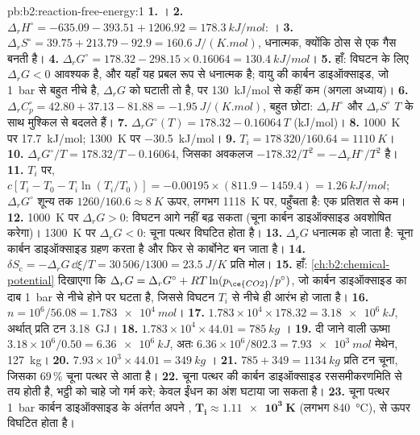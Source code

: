 \begin{solution}{pb:b2:reaction-free-energy:1}
\textbf{1.} ।
\textbf{2.} $\Delta_r H^\circ = -635.09 - 393.51 + 1206.92 =
\qty{+178.3}{kJ/mol}$: ।
\textbf{3.} $\Delta_r S^\circ = 39.75 + 213.79 - 92.9 = \qty{+160.6}{J/(K.mol)}$,
धनात्मक, क्योंकि ठोस से एक गैस बनती है।
\textbf{4.} $\Delta_r G^\circ = 178.32 - 298.15 \times 0.16064 =
\qty{+130.4}{kJ/mol}$।
\textbf{5.} हाँ: विघटन के लिए $\Delta_r G < 0$ आवश्यक है, और यहाँ यह
प्रबल रूप से धनात्मक है; वायु की कार्बन डाइऑक्साइड, जो \qty{1}{bar} से बहुत नीचे है,
$\Delta_r G$ को घटाती तो है, पर \qty{130}{kJ/mol} से कहीं कम (अगला अध्याय)।
\textbf{6.} $\Delta_r C^\circ_p = 42.80 + 37.13 - 81.88 =
\qty{-1.95}{J/(K.mol)}$, बहुत छोटा: $\Delta_r H^\circ$ और $\Delta_r S^\circ$
$T$ के साथ मुश्किल से बदलते हैं।
\textbf{7.} $\Delta_r G^\circ(T) = 178.32 - 0.16064\,T$ (\unit{kJ/mol})।
\textbf{8.} \qty{1000}{K} पर \qty{+17.7}{kJ/mol}; \qty{1300}{K} पर
\qty{-30.5}{kJ/mol}।
\textbf{9.} $T_i = 178\,320/160.64 = \qty{1110}{K}$।
\textbf{10.} $\Delta_r G^\circ/T = 178.32/T - 0.16064$, जिसका अवकलज
$-178.32/T^2 = -\Delta_r H^\circ/T^2$ है।
\textbf{11.} $T_i$ पर, $c[T_i - T_0 - T_i\ln(T_i/T_0)] = -0.00195 \times
(811.9 - 1459.4) = \qty{+1.26}{kJ/mol}$; $\Delta_r G^\circ$ शून्य तक
$1260/160.6 \approx \qty{8}{K}$ ऊपर, लगभग \qty{1118}{K} पर, पहुँचता है: एक
प्रतिशत से कम।
\textbf{12.} \qty{1000}{K} पर $\Delta_r G > 0$: विघटन आगे नहीं
बढ़ सकता (चूना कार्बन डाइऑक्साइड अवशोषित करेगा)। \qty{1300}{K} पर $\Delta_r G <
0$: चूना पत्थर विघटित होता है।
\textbf{13.} $\Delta_r G$ धनात्मक हो जाता है: चूना कार्बन डाइऑक्साइड ग्रहण करता है
और फिर से कार्बोनेट बन जाता है।
\textbf{14.} $\delta S_{\text{c}} = -\Delta_r G\,\dd\xi/T = 30\,506/1300 =
\qty{23.5}{J/K}$ प्रति मोल।
\textbf{15.} हाँ: \cref{ch:b2:chemical-potential} दिखाएगा कि
$\Delta_r G = \Delta_r G^\circ + RT\ln(p_{\ce{CO2}}/p^\circ)$, जो
कार्बन डाइऑक्साइड का दाब \qty{1}{bar} से नीचे होने पर घटता है, जिससे
विघटन $T_i$ से नीचे ही आरंभ हो जाता है।
\textbf{16.} $n = 10^6/56.08 = \qty{1.783e4}{mol}$।
\textbf{17.} $1.783 \times 10^4 \times 178.32 = \qty{3.18e6}{kJ}$, अर्थात्
प्रति टन \qty{3.18}{GJ}।
\textbf{18.} $1.783 \times 10^4 \times 44.01 = \qty{785}{kg}$ ।
\textbf{19.} दी जाने वाली ऊष्मा $3.18 \times 10^6/0.50 = \qty{6.36e6}{kJ}$, अतः
$6.36 \times 10^6/802.3 = \qty{7.93e3}{mol}$ मेथेन, \qty{127}{kg}।
\textbf{20.} $7.93 \times 10^3 \times 44.01 = \qty{349}{kg}$ ।
\textbf{21.} $785 + 349 = \qty{1134}{kg}$ प्रति टन चूना, जिसका 69\,\% चूना पत्थर
से आता है।
\textbf{22.} चूना पत्थर की कार्बन डाइऑक्साइड रससमीकरणमिति से तय होती है,
भट्ठी को चाहे जो गर्म करे; केवल ईंधन का अंश घटाया जा सकता है।
\textbf{23.} चूना पत्थर \qty{1}{bar} कार्बन डाइऑक्साइड के अंतर्गत अपने
, $\boldsymbol{T_i \approx \qty{1.11e3}{K}}$
(लगभग \qty{840}{\celsius}), से ऊपर विघटित होता है।
\end{solution}
